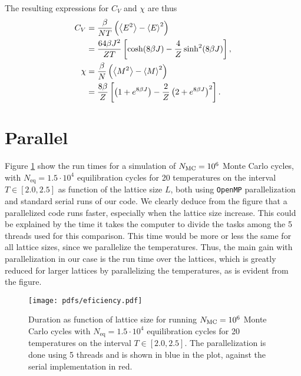 The resulting expressions for $C_V$ and $\chi$ are thus 
\begin{align}
    C_V &= \frac{\beta}{N T}\left( \expval{E^2} - \expval{E}^2 \right) \nonumber \\ 
    &= \frac{64\beta J^2}{Z T} \left[ \cosh(8\beta J) - \frac{4}{Z}\sinh^2(8\beta J) \right], \label{eq:analytical_CV} \\ 
    \chi &= \frac{\beta}{N}\left( \expval{M^2} - \expval{M}^2 \right) \nonumber \\
    &= \frac{8\beta}{Z}\left[ \left( 1+e^{8\beta J} \right) - \frac{2}{Z}\left( 2+e^{8\beta J} \right)^2 \right]. \label{eq:analytical_magnetic_susceptibility}
\end{align}


\section{Parallel}\label{app:parallel}

Figure \ref{fig:efficiency} show the run times for a simulation of $N_\mathrm{MC}=10^6$ Monte Carlo cycles, with $N_\mathrm{eq} = 1.5\cdot 10^4$ equilibration cycles for 20 temperatures on the interval $T\in[2.0, 2.5]$ as function of the lattice size $L$, both using \texttt{OpenMP} parallelization and standard serial runs of our code. We clearly deduce from the figure that a parallelized code runs faster, especially when the lattice size increase. This could be explained by the time it takes the computer to divide the tasks among the 5 threads used for this comparison. This time would be more or less the same for all lattice sizes, since we parallelize the temperatures. Thus, the main gain with parallelization in our case is the run time over the lattices, which is greatly reduced for larger lattices by parallelizing the temperatures, as is evident from the figure.

\begin{figure}[!ht]
    \texttt{[image: pdfs/eficiency.pdf]} 
    \caption{Duration as function of lattice size for running $N_\mathrm{MC}=10^6$ Monte Carlo cycles with $N_\mathrm{eq}=1.5\cdot 10^4$ equilibration cycles for 20 temperatures on the interval $T\in[2.0,2.5]$. The parallelization is done using 5 threads and is shown in blue in the plot, against the serial implementation in red.} 
    \label{fig:efficiency}
\end{figure} 